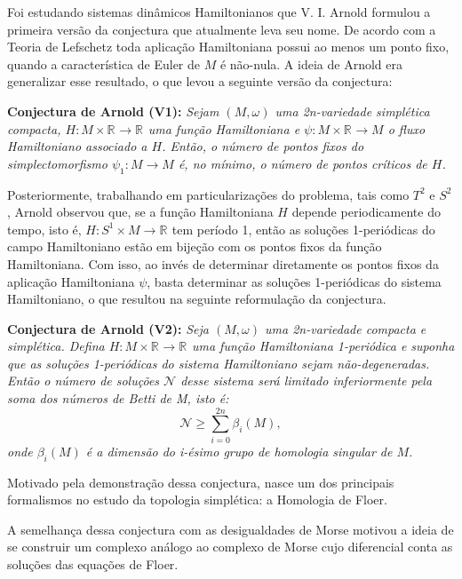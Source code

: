 \documentclass[12pt]{book}
\newcommand{\circulo}{S^{1}}
\newcommand{\circulovariedade}{\circulo\times M}
\newcommand{\real}[1]{\mathbb{R}^{#1}}
\newcommand{\reta}{\real{}}
\begin{document}
	Foi estudando sistemas dinâmicos Hamiltonianos que V. I. Arnold formulou a primeira versão da conjectura que atualmente leva seu nome. De acordo com a Teoria de Lefschetz toda aplicação Hamiltoniana possui ao menos um ponto fixo, quando a característica de Euler de $M$ é não-nula. A ideia de Arnold era generalizar esse resultado, o que levou a seguinte versão da conjectura:
	
	\textbf{Conjectura de Arnold (V1):} \textit{
		Sejam $(M, \omega)$ uma 2n-variedade simplética compacta, $H:M\times \reta\to \reta$ uma função Hamiltoniana e $\psi:M\times \reta \to M$ o fluxo Hamiltoniano associado a $H$. Então, o número de pontos fixos do simplectomorfismo $\psi_{1}:M\to M$ é, no mínimo, o número de pontos críticos de $H$.}
	
	Posteriormente, trabalhando em particularizações do problema, tais como $T^{2}$ e $S^{2}$, Arnold observou que, se a função Hamiltoniana $H$ depende periodicamente do tempo, isto é, $H:\circulovariedade\to \reta$ tem período 1, então as soluções 1-periódicas do campo Hamiltoniano estão em bijeção com os pontos fixos da função Hamiltoniana. Com isso, ao invés de determinar diretamente os pontos fixos da aplicação Hamiltoniana $\psi$, basta determinar as soluções 1-periódicas do sistema Hamiltoniano, o que resultou na seguinte reformulação da conjectura.
	
	\textbf{Conjectura de Arnold (V2):} \textit	{Seja $(M,\omega)$ uma 2n-variedade compacta e simplética. Defina $H:M\times \real{} \to \reta$ uma função Hamiltoniana 1-periódica e suponha que as soluções 1-periódicas do sistema Hamiltoniano sejam não-degeneradas. Então o número de soluções $\mathcal{N}$ desse sistema será limitado inferiormente pela soma dos números de Betti de M, isto é:
		$$
		\mathcal{N}\geq \sum_{i=0}^{2n}\beta_{i}(M),
		$$
		onde $\beta_{i}(M)$ é a dimensão do i-ésimo grupo de homologia singular de $M$.}
	
	Motivado pela demonstração dessa conjectura, nasce um dos principais formalismos no estudo da topologia simplética: a Homologia de Floer.
	
	A semelhança dessa conjectura com as desigualdades de Morse motivou a ideia de se construir um complexo análogo ao complexo de Morse cujo diferencial conta as soluções das equações de Floer.
	
\end{document}
